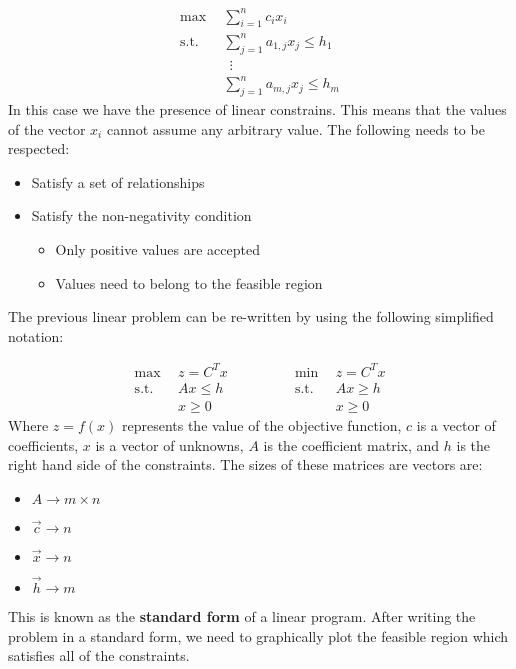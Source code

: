 \documentclass{article}
\begin{document}
\begin{align*}
	\max~~ & \sum_{i = 1}^n c_ix_i \\
	\text{s.t.}~~ & \sum_{j = 1}^n a_{1,j}x_j \leq h_1 \\
	~~&~~ \vdots \\
	~~& \sum_{j = 1}^n a_{m,j}x_j \leq h_m
\end{align*}
In this case we have the presence of linear constrains. This means that the values of the vector $x_i$ cannot assume any arbitrary value. The following needs to be respected:

\begin{itemize}
	\item Satisfy a set of relationships
	\item Satisfy the non-negativity condition
	\begin{itemize}
		\item Only positive values are accepted
		\item Values need to belong to the feasible region
	\end{itemize}
\end{itemize}
The previous linear problem can be re-written by using the following simplified notation:

\begin{equation*}
  \begin{split}
    \max~~ & z = C^Tx \\
	\text{s.t.}~~ & Ax \leq h \\
	~~& x \geq 0
  \end{split}
\quad\quad\quad\quad
  \begin{split}
    \min~~ & z = C^Tx \\
	\text{s.t.}~~ & Ax \geq h \\
	~~& x \geq 0
  \end{split}
\end{equation*}
Where $z = f(x)$ represents the value of the objective function, $c$ is a vector of coefficients, $x$ is a vector of unknowns, $A$ is the coefficient matrix, and $h$ is the right hand side of the constraints. The sizes of these matrices are vectors are:

\begin{itemize}
	\item $A \rightarrow m \times n$
	\item $\overrightarrow{c} \rightarrow n$
	\item $\overrightarrow{x} \rightarrow n$
	\item $\overrightarrow{h} \rightarrow m$
\end{itemize}
This is known as the \textbf{standard form} of a linear program. After writing the problem in a standard form, we need to graphically plot the feasible region which satisfies all of the constraints.
\end{document}
